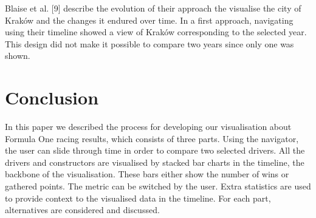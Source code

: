 \documentclass{sigchi}
\begin{document}
Blaise et al. [9] describe the evolution of their approach the visualise the city of Kraków and the changes it endured over time. In a first approach, navigating using their timeline showed a view of Kraków corresponding to the selected year. This design did not make it possible to compare two years since only one was shown. 

\section{Conclusion} %
\label{sec:conclusion}
In this paper we described the process for developing our visualisation about Formula One racing results, which consists of three parts. Using the navigator, the user can slide through time in order to compare two selected drivers. All the drivers and constructors are visualised by stacked bar charts in the timeline, the backbone of the visualisation. These bars either show the number of wins or gathered points. The metric can be switched by the user. Extra statistics are used to provide context to the visualised data in the timeline. For each part, alternatives are considered and discussed.


%
%
%
%
%
\balance



\end{document}
